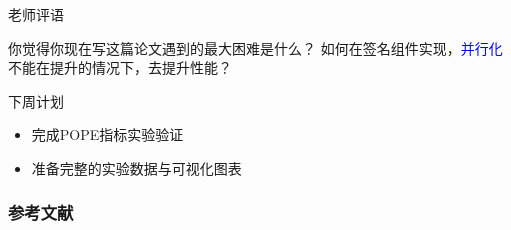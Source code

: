 \documentclass{beamer}
\begin{document}
\begin{frame}{老师评语}

  \begin{alertblock}{你觉得你现在写这篇论文遇到的最大困难是什么？}
    如何在签名组件实现，\textcolor{blue}{并行化}不能在提升的情况下，去提升性能？
  \end{alertblock}
  \vfill

  \begin{block}{下周计划}
    \begin{itemize}
      \item 完成POPE指标实验验证
      \item 准备完整的实验数据与可视化图表
    \end{itemize}
  \end{block}

\end{frame}

\begin{frame}
  \frametitle{参考文献}
  
  
\end{frame}

\end{document}
